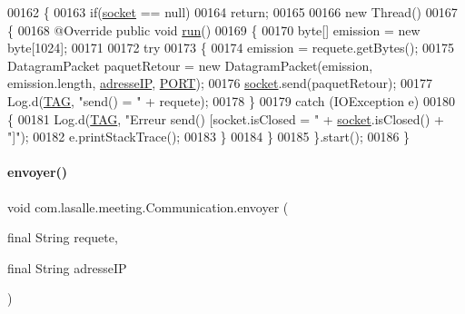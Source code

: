\begin{DoxyCode}
00162     \{
00163         \textcolor{keywordflow}{if}(\hyperlink{classcom_1_1lasalle_1_1meeting_1_1_communication_a2a538f36640aecebbb833bbaf1f03858}{socket} == null)
00164             \textcolor{keywordflow}{return};
00165 
00166         \textcolor{keyword}{new} Thread()
00167         \{
00168             @Override \textcolor{keyword}{public} \textcolor{keywordtype}{void} \hyperlink{classcom_1_1lasalle_1_1meeting_1_1_communication_afe29bde1b4538990bd0a8c9b2d512efa}{run}()
00169             \{
00170                 byte[] emission = \textcolor{keyword}{new} byte[1024];
00171 
00172                 \textcolor{keywordflow}{try}
00173                 \{
00174                     emission = requete.getBytes();
00175                     DatagramPacket paquetRetour = \textcolor{keyword}{new} DatagramPacket(emission, emission.length, 
      \hyperlink{classcom_1_1lasalle_1_1meeting_1_1_communication_a46e5fbc8ec97ad651d544e09121a6468}{adresseIP}, \hyperlink{classcom_1_1lasalle_1_1meeting_1_1_communication_abf48fd6a29d87d67f4941494404f1ea7}{PORT});
00176                     \hyperlink{classcom_1_1lasalle_1_1meeting_1_1_communication_a2a538f36640aecebbb833bbaf1f03858}{socket}.send(paquetRetour);
00177                     Log.d(\hyperlink{classcom_1_1lasalle_1_1meeting_1_1_communication_a5d58f88df1f20b4d61edbed9a82eccab}{TAG}, \textcolor{stringliteral}{"send() = "} + requete);
00178                 \}
00179                 \textcolor{keywordflow}{catch} (IOException e)
00180                 \{
00181                     Log.d(\hyperlink{classcom_1_1lasalle_1_1meeting_1_1_communication_a5d58f88df1f20b4d61edbed9a82eccab}{TAG}, \textcolor{stringliteral}{"Erreur send() [socket.isClosed = "} + \hyperlink{classcom_1_1lasalle_1_1meeting_1_1_communication_a2a538f36640aecebbb833bbaf1f03858}{socket}.isClosed() + \textcolor{stringliteral}{"]"});
00182                     e.printStackTrace();
00183                 \}
00184             \}
00185         \}.start();
00186     \}
\end{DoxyCode}
\mbox{\label{classcom_1_1lasalle_1_1meeting_1_1_communication_a5dc5cc6c702a8d5da58c06afde637853}} 
\paragraph{\texorpdfstring{envoyer()}{envoyer()}\hspace{0.1cm}{\footnotesize\ttfamily [2/2]}}
{\footnotesize\ttfamily void com.\+lasalle.\+meeting.\+Communication.\+envoyer (\begin{DoxyParamCaption}\item[{final String}]{requete,  }\item[{final String}]{adresse\+IP }\end{DoxyParamCaption})}



